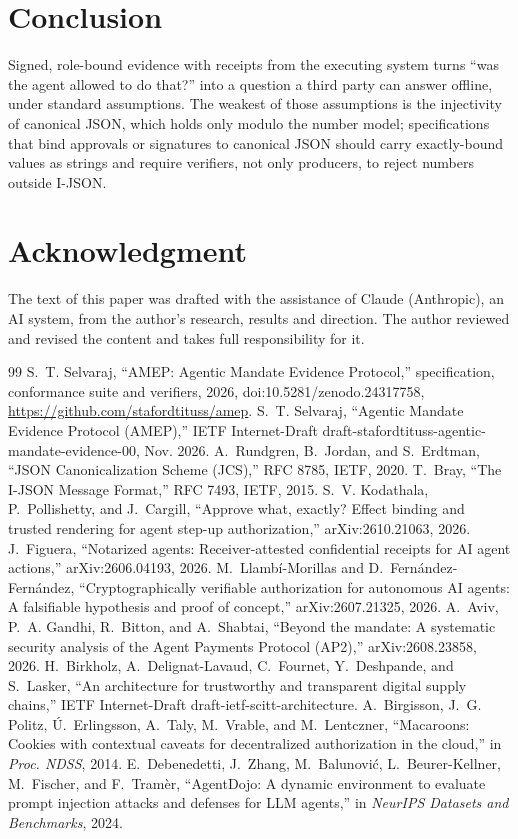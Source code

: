 \documentclass[11pt,a4paper]{article}
\theoremstyle{definition}
\theoremstyle{remark}
\begin{document}
\section{Conclusion}

Signed, role-bound evidence with receipts from the executing system turns ``was the agent allowed to do that?'' into a question a third party can answer offline, under standard assumptions. The weakest of those assumptions is the injectivity of canonical JSON, which holds only modulo the number model; specifications that bind approvals or signatures to canonical JSON should carry exactly-bound values as strings and require verifiers, not only producers, to reject numbers outside I-JSON.

\section*{Acknowledgment}
The text of this paper was drafted with the assistance of Claude (Anthropic), an AI system, from the author's research, results and direction. The author reviewed and revised the content and takes full responsibility for it.

\begin{thebibliography}{99}
 S.~T. Selvaraj, ``AMEP: Agentic Mandate Evidence Protocol,'' specification, conformance suite and verifiers, 2026, doi:10.5281/zenodo.24317758, \url{https://github.com/stafordtituss/amep}.
 S.~T. Selvaraj, ``Agentic Mandate Evidence Protocol (AMEP),'' IETF Internet-Draft draft-stafordtituss-agentic-mandate-evidence-00, Nov. 2026.
 A.~Rundgren, B.~Jordan, and S.~Erdtman, ``JSON Canonicalization Scheme (JCS),'' RFC 8785, IETF, 2020.
 T.~Bray, ``The I-JSON Message Format,'' RFC 7493, IETF, 2015.
 S.~V. Kodathala, P.~Pollishetty, and J.~Cargill, ``Approve what, exactly? Effect binding and trusted rendering for agent step-up authorization,'' arXiv:2610.21063, 2026.
 J.~Figuera, ``Notarized agents: Receiver-attested confidential receipts for AI agent actions,'' arXiv:2606.04193, 2026.
 M.~Llamb{\'i}-Morillas and D.~Fern{\'a}ndez-Fern{\'a}ndez, ``Cryptographically verifiable authorization for autonomous AI agents: A falsifiable hypothesis and proof of concept,'' arXiv:2607.21325, 2026.
 A.~Aviv, P.~A. Gandhi, R.~Bitton, and A.~Shabtai, ``Beyond the mandate: A systematic security analysis of the Agent Payments Protocol (AP2),'' arXiv:2608.23858, 2026.
 H.~Birkholz, A.~Delignat-Lavaud, C.~Fournet, Y.~Deshpande, and S.~Lasker, ``An architecture for trustworthy and transparent digital supply chains,'' IETF Internet-Draft draft-ietf-scitt-architecture.
 A.~Birgisson, J.~G. Politz, {\'U}.~Erlingsson, A.~Taly, M.~Vrable, and M.~Lentczner, ``Macaroons: Cookies with contextual caveats for decentralized authorization in the cloud,'' in \emph{Proc. NDSS}, 2014.
 E.~Debenedetti, J.~Zhang, M.~Balunovi{\'c}, L.~Beurer-Kellner, M.~Fischer, and F.~Tram{\`e}r, ``AgentDojo: A dynamic environment to evaluate prompt injection attacks and defenses for LLM agents,'' in \emph{NeurIPS Datasets and Benchmarks}, 2024.
\end{thebibliography}
\end{document}
